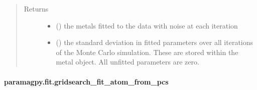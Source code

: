 \documentclass[a4paper,10pt,english,openany,oneside]{sphinxmanual}
\begin{document}
\begin{fulllineitems}
\begin{quote}
\begin{description}
\item[{Returns}] \leavevmode
\begin{itemize}
\item {} 
 () \textendash{} the metals fitted to the data with noise at each iteration

\item {} 
 () \textendash{} the standard deviation in fitted parameters over all iterations of the
Monte Carlo simulation.
These are stored within the metal object. All unfitted parameters
are zero.

\end{itemize}


\end{description}\end{quote}

\end{fulllineitems}



\paragraph{paramagpy.fit.gridsearch\_fit\_atom\_from\_pcs}
\label{\detokenize{reference/generated/paramagpy.fit.gridsearch_fit_atom_from_pcs:paramagpy-fit-gridsearch-fit-atom-from-pcs}}\label{\detokenize{reference/generated/paramagpy.fit.gridsearch_fit_atom_from_pcs::doc}}
\end{document}
